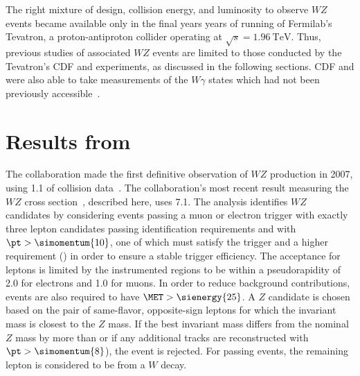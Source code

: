 The right mixture of design, collision energy, and luminosity to observe $WZ$ events became available only in the final years years of running of Fermilab's Tevatron, a proton-antiproton collider operating at $\sqrt{s}=\SI{1.96}{\TeV}$.  Thus, previous studies of associated $WZ$ events are limited to those conducted by the Tevatron's CDF and \dzero{} experiments, as discussed in the following sections.  CDF and \dzero{} were also able to take measurements of the $W\gamma$ states which had not been previously accessible~\cite{PhysRevLett.94.041803,PhysRevD.71.091108}.

\section{Results from \cdf}
The \cdf collaboration made the first definitive observation of $WZ$ production in 2007, using \SI{1.1}{\fbinv} of collision data~\cite{CDF:WZObservation}.  The collaboration's most recent result measuring the $WZ$ cross section~\cite{Aaltonen:2012vu}, described here, uses \SI{7.1}{\fbinv}.
The analysis identifies $WZ$ candidates by considering events passing a muon or electron trigger with exactly three lepton candidates passing identification requirements and with $\pt > \simomentum{10}$, one of which must satisfy the trigger and a higher \pt requirement () in order to ensure a stable trigger efficiency.  The acceptance for leptons is limited by the instrumented regions to be within a pseudorapidity of 2.0 for electrons and 1.0 for muons.  In order to reduce background contributions, events are also required to have $\MET > \sienergy{25}$. %
A $Z$ candidate is chosen based on the pair of same-flavor, opposite-sign leptons for which the invariant mass is closest to the $Z$ mass.  If the best invariant mass differs from the nominal $Z$ mass by more than  or if any additional tracks are reconstructed with $\pt > \simomentum{8}$), the event is rejected.  For passing events, the remaining lepton is considered to be from a $W$ decay.


